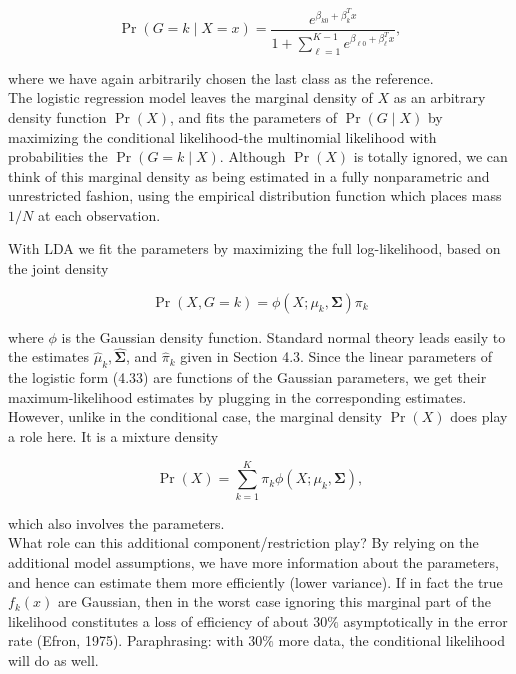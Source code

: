 \documentclass[10pt]{article}
\begin{document}
\begin{equation*}
\operatorname{Pr}(G=k \mid X=x)=\frac{e^{\beta_{k 0}+\beta_{k}^{T} x}}{1+\sum_{\ell=1}^{K-1} e^{\beta_{\ell 0}+\beta_{\ell}^{T} x}}, \tag{4.36}
\end{equation*}


where we have again arbitrarily chosen the last class as the reference.\\
The logistic regression model leaves the marginal density of $X$ as an arbitrary density function $\operatorname{Pr}(X)$, and fits the parameters of $\operatorname{Pr}(G \mid X)$ by maximizing the conditional likelihood-the multinomial likelihood with probabilities the $\operatorname{Pr}(G=k \mid X)$. Although $\operatorname{Pr}(X)$ is totally ignored, we can think of this marginal density as being estimated in a fully nonparametric and unrestricted fashion, using the empirical distribution function which places mass $1 / N$ at each observation.

With LDA we fit the parameters by maximizing the full log-likelihood, based on the joint density


\begin{equation*}
\operatorname{Pr}(X, G=k)=\phi\left(X ; \mu_{k}, \boldsymbol{\Sigma}\right) \pi_{k} \tag{4.37}
\end{equation*}


where $\phi$ is the Gaussian density function. Standard normal theory leads easily to the estimates $\hat{\mu}_{k}, \hat{\boldsymbol{\Sigma}}$, and $\hat{\pi}_{k}$ given in Section 4.3. Since the linear parameters of the logistic form (4.33) are functions of the Gaussian parameters, we get their maximum-likelihood estimates by plugging in the corresponding estimates. However, unlike in the conditional case, the marginal density $\operatorname{Pr}(X)$ does play a role here. It is a mixture density


\begin{equation*}
\operatorname{Pr}(X)=\sum_{k=1}^{K} \pi_{k} \phi\left(X ; \mu_{k}, \boldsymbol{\Sigma}\right), \tag{4.38}
\end{equation*}


which also involves the parameters.\\
What role can this additional component/restriction play? By relying on the additional model assumptions, we have more information about the parameters, and hence can estimate them more efficiently (lower variance). If in fact the true $f_{k}(x)$ are Gaussian, then in the worst case ignoring this marginal part of the likelihood constitutes a loss of efficiency of about $30 \%$ asymptotically in the error rate (Efron, 1975). Paraphrasing: with $30 \%$ more data, the conditional likelihood will do as well.
\end{document}
